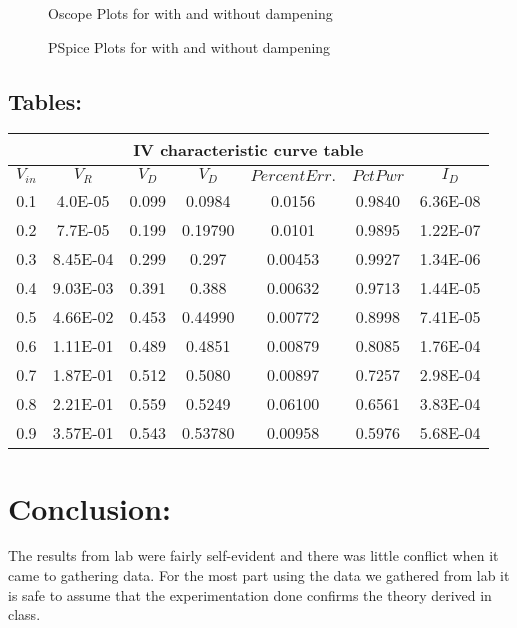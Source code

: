 \documentclass[10pt,a4paper]{article}
\begin{document}
\begin{figure}[!ht]
    \centering
    \qquad
    \caption{Oscope Plots for with and without dampening }%
    \label{fig:example}%
\end{figure}



\begin{figure}[!ht]
    \centering
    \qquad
    \caption{PSpice Plots for with and without dampening }%
    \label{fig:example}%
\end{figure}
\vspace{5mm} 



\subsection{Tables:}
\begin{center}
\begin{tabular}{|c|c|c||c|c|c|c|}
\hline 
\multicolumn{7}{|c|}{IV characteristic curve table} \\ 
\hline 
$V_{in}$& $V_{R}$ & $V_{D}$ & $V_{D}$ & $Percent Err.$ & $PctPwr$ & $I_{D}$\\ 
\hline 
0.1 & 4.0E-05 & 0.099& 0.0984 & 0.0156 & 0.9840 & 6.36E-08 \\ 
\hline 
0.2 & 7.7E-05& 0.199& 0.19790 & 0.0101 & 0.9895 & 1.22E-07 \\ 
\hline 
0.3 & 8.45E-04& 0.299 & 0.297 & 0.00453 & 0.9927 & 1.34E-06 \\ 
\hline 
0.4 & 9.03E-03 & 0.391 & 0.388& 0.00632 & 0.9713 & 1.44E-05 \\ 
\hline 
0.5 & 4.66E-02 & 0.453 & 0.44990 & 0.00772 & 0.8998 & 7.41E-05 \\ 
\hline 
0.6 & 1.11E-01 & 0.489 & 0.4851& 0.00879 & 0.8085 & 1.76E-04\\ 
\hline 
0.7  & 1.87E-01 & 0.512 & 0.5080 & 0.00897 & 0.7257 & 2.98E-04 \\ 
\hline 
0.8 & 2.21E-01 & 0.559 & 0.5249 & 0.06100 & 0.6561 &  3.83E-04 \\ 
\hline 
0.9 & 3.57E-01& 0.543 & 0.53780 & 0.00958 & 0.5976 & 5.68E-04 \\ 
\hline 
\end{tabular} 
\end{center}

\section*{Conclusion:}
The results from lab were fairly self-evident and there was little conflict when it came to gathering data. For the most part using the data we gathered from lab it is safe to assume that the experimentation done confirms the theory derived in class.

 
\end{document}
